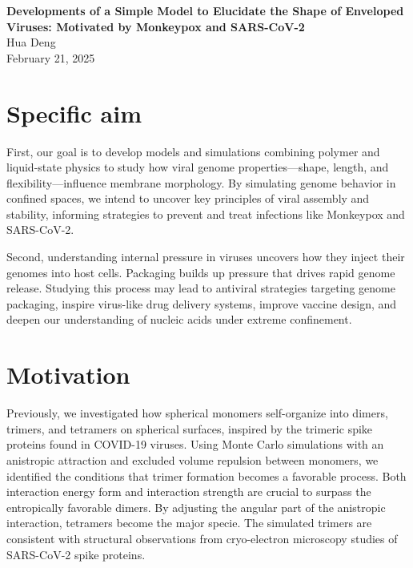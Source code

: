 \documentclass[12pt]{article}
\begin{document}
\doublespacing

\begin{center}
{\Large \textbf{Developments of a Simple Model to Elucidate the Shape of Enveloped Viruses: Motivated by Monkeypox and SARS-CoV-2}}\\[1.5ex]
{\normalsize  Hua Deng}\\

{\normalsize February 21, 2025}
\end{center}


\begin{flushleft}
\setlength{\parindent}{30pt}
\section*{Specific aim}


First, our goal is to develop models and simulations combining polymer and liquid-state physics to study how viral genome properties—shape, length, and flexibility—influence membrane morphology. By simulating genome behavior in confined spaces, we intend to uncover key principles of viral assembly and stability, informing strategies to prevent and treat infections like Monkeypox and SARS-CoV-2.

Second, understanding internal pressure in viruses uncovers how they inject their genomes into host cells. Packaging builds up pressure that drives rapid genome release. Studying this process may lead to antiviral strategies targeting genome packaging, inspire virus-like drug delivery systems, improve vaccine design, and deepen our understanding of nucleic acids under extreme confinement.
\vspace{-1em} 
\section*{Motivation}

Previously, we investigated how spherical monomers self-organize into dimers, trimers, and tetramers on spherical surfaces, inspired by the trimeric spike proteins found in COVID-19 viruses. Using Monte Carlo simulations with an anistropic attraction and excluded volume repulsion between monomers, we identified the conditions that trimer formation becomes a favorable process. Both interaction energy form and interaction strength are crucial to surpass the entropically favorable dimers.  By adjusting the angular part of the anistropic interaction, tetramers become the major specie. The simulated trimers are consistent with structural observations from cryo-electron microscopy studies of SARS-CoV-2 spike proteins\cite{Ke2020}. 



\end{flushleft}
\end{document}
